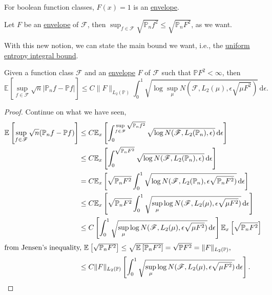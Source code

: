 \begin{eg}
	For boolean function classes, \(F(x) = 1\) is an \hyperref[def:envelope]{envelope}.
\end{eg}

\begin{remark}
	Let \(F\) be an \hyperref[def:envelope]{envelope} of \(\mathscr{F} \), then \(\sup _{f\in \mathscr{F} }\sqrt{\mathbb{P} _n f^2} \leq \sqrt{\mathbb{P} _n F^2} \), as we want.
\end{remark}

With this new notion, we can state the main bound we want, i.e., the \hyperref[thm:uniform-entropy-integral-bound]{uniform entropy integral bound}.

\begin{theorem}\label{thm:uniform-entropy-integral-bound}
	Given a function class \(\mathscr{F} \) and an \hyperref[def:envelope]{envelope} \(F\) of \(\mathscr{F} \) such that \(\mathbb{P} F^2 < \infty \), then
	\[
		\mathbb{E}_{}\left[\sup _{f\in \mathscr{F} } \sqrt{n} \vert \mathbb{P} _n f - \mathbb{P} f \vert  \right]
		\leq C \lVert F \rVert _{L_2(\mathbb{P} )} \int_{0}^{1} \sqrt{\log \sup _\mu N(\mathscr{F} , L_2(\mu ), \epsilon \sqrt{\mu F^2} )}  \,\mathrm{d}\epsilon .
	\]
\end{theorem}
\begin{proof}
	Continue on what we have seen,
	\begin{align*}
		\mathbb{E}_{}\left[\sup _{f\in \mathscr{F} } \sqrt{n} (\mathbb{P} _n f - \mathbb{P} f) \right]
		 & \leq C \mathbb{E}_{x}\left[ \int_{0}^{\sup\limits _{f\in \mathscr{F} } \sqrt{\mathbb{P} _n f^2} } \sqrt{\log N(\mathscr{F} , L_2(\mathbb{P} _n), \epsilon )} \,\mathrm{d}\epsilon \right] \\
		 & \leq C \mathbb{E}_{x}\left[\int_{0}^{\sqrt{\mathbb{P} _n F^2} } \sqrt{\log N(\mathscr{F} , L_2(\mathbb{P} _n), \epsilon )} \,\mathrm{d}\epsilon \right]                                   \\
		 & = C \mathbb{E}_{x}\left[ \sqrt{\mathbb{P} _n F^2} \int_{0}^{1} \sqrt{\log N(\mathscr{F} , L_2(\mathbb{P} _n), \epsilon \sqrt{\mathbb{P} _n F^2} )} \,\mathrm{d}\epsilon \right]           \\
		 & \leq C \mathbb{E}_{x}\left[\sqrt{\mathbb{P} _n F^2} \int_{0}^{1} \sqrt{\sup _\mu \log N(\mathscr{F} , L_2(\mu ), \epsilon \sqrt{\mu F^2} )} \,\mathrm{d}\epsilon \right]                  \\
		 & \leq C \left[ \int_{0}^{1} \sqrt{\sup _\mu \log N(\mathscr{F} , L_2(\mu ), \epsilon \sqrt{\mu F^2} )} \,\mathrm{d}\epsilon \right] \mathbb{E}_{x}\left[\sqrt{\mathbb{P} _n F^2}  \right]  \\
		\shortintertext{from Jensen's inequality, \(\mathbb{E}_{}\left[\sqrt{\mathbb{P} _n F^2} \right] \leq \sqrt{\mathbb{E}_{}\left[\mathbb{P} _n F^2 \right] } = \sqrt{\mathbb{P} F^2} = \lVert F \rVert _{L_2(\mathbb{P} )}\),}
		 & \leq C \lVert F \rVert _{L_2(\mathbb{P} )} \left[ \int_{0}^{1} \sqrt{\sup _\mu \log N(\mathscr{F} , L_2(\mu ), \epsilon \sqrt{\mu F^2} )} \,\mathrm{d}\epsilon \right] .
	\end{align*}
\end{proof}

